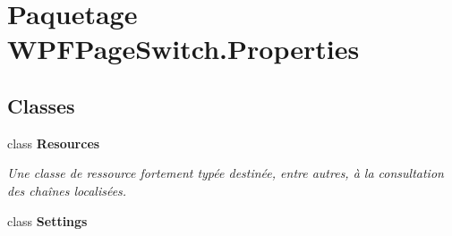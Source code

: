 \hypertarget{namespace_w_p_f_page_switch_1_1_properties}{\section{Paquetage W\+P\+F\+Page\+Switch.\+Properties}
\label{namespace_w_p_f_page_switch_1_1_properties}
}
\subsection*{Classes}
\begin{DoxyCompactItemize}
\item 
class {\bfseries Resources}
\begin{DoxyCompactList}\small\item\em Une classe de ressource fortement typée destinée, entre autres, à la consultation des chaînes localisées. \end{DoxyCompactList}\item 
class {\bfseries Settings}
\end{DoxyCompactItemize}
